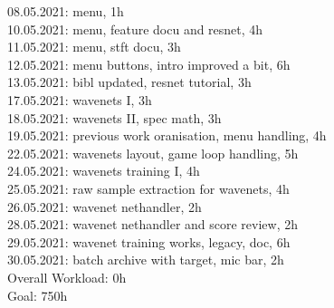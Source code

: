 08.05.2021: menu, 1h\\
10.05.2021: menu, feature docu and resnet, 4h\\
11.05.2021: menu, stft docu, 3h\\
12.05.2021: menu buttons, intro improved a bit, 6h\\

13.05.2021: bibl updated, resnet tutorial, 3h\\
17.05.2021: wavenets I, 3h\\

18.05.2021: wavenets II, spec math, 3h\\
19.05.2021: previous work oranisation, menu handling, 4h\\
22.05.2021: wavenets layout, game loop handling, 5h\\

24.05.2021: wavenets training I, 4h\\
25.05.2021: raw sample extraction for wavenets, 4h\\

26.05.2021: wavenet nethandler, 2h\\
28.05.2021: wavenet nethandler and score review, 2h\\
29.05.2021: wavenet training works, legacy, doc, 6h\\

30.05.2021: batch archive with target, mic bar, 2h\\

\vspace{0.5cm}
\noindent
Overall Workload: 0h\\
Goal: 750h